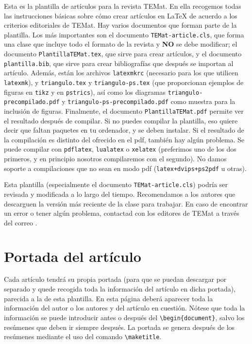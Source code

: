 \documentclass[bibtex, anon]{TEMat-article}
\begin{document}
Esta es la plantilla de artículos para la revista TEMat.
En ella recogemos todas las instrucciones básicas sobre cómo crear artículos en \LaTeX{} de acuerdo a los criterios editoriales de TEMat.
Hay varios documentos que forman parte de la plantilla.
Los más importantes son el documento \verb+TEMat-article.cls+, que forma una clase que incluye todo el formato de la revista y \textbf{NO} se debe modificar; el documento \verb+PlantillaTEMat.tex+, que sirve para crear artículos, y el documento \verb+plantilla.bib+, que sirve para crear bibliografías que después se importan al artículo.
Además, están los archivos \verb+latexmkrc+ (necesario para los que utilicen \verb+latexmk+), y \verb+triangulo.tex+ y \verb+triangulo-ps.tex+ (que proporcionan ejemplos de figuras en \verb+tikz+ y en \verb+pstrics+), así como los diagramas \verb+triangulo-precompilado.pdf+ y \verb+triangulo-ps-precompilado.pdf+ como muestra para la inclusión de figuras.
Finalmente, el documento \verb+PlantillaTEMat.pdf+ permite ver el resultado después de compilar.
Si no puedes compilar la plantilla, eso quiere decir que faltan paquetes en tu ordenador, y se deben instalar.
Si el resultado de la compilación es distinto del ofrecido en el pdf, también hay algún problema.
Se puede compilar con \verb+pdflatex+, \verb+lualatex+ o \verb+xelatex+ (preferimos uno de los dos primeros, y en principio nosotros compilaremos con el segundo).
No damos soporte a compilaciones que no sean en modo pdf (\verb|latex+dvips+ps2pdf| u otras).

Esta plantilla (especialmente el documento \verb+TEMat-article.cls+) podría ser revisada y modificada a lo largo del tiempo.
Recomendamos a los autores que descarguen la versión más reciente de la clase para trabajar.
En caso de encontrar un error o tener algún problema, contactad con los editores de TEMat a través del correo .

\section{Portada del artículo}

Cada artículo tendrá su propia portada (para que se puedan descargar por separado y quede recogida toda la información del artículo en dicha portada), parecida a la de esta plantilla.
En esta página deberá aparecer toda la información del autor o los autores y del artículo en cuestión.
Nótese que toda la información se puede introducir antes o después del \verb+\begin{document}+, salvo los resúmenes que deben ir siempre después.
La portada se genera después de los resúmenes mediante el uso del comando \verb+\maketitle+.
\end{document}
